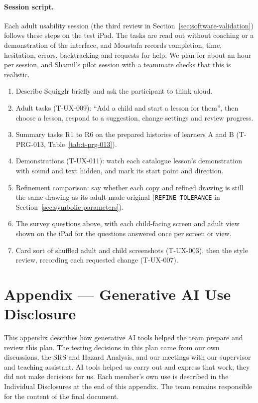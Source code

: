\documentclass[12pt, titlepage]{article}
\begin{document}
\paragraph{Session script.} Each adult usability session (the third review in
Section~\ref{sec:software-validation}) follows these steps on the test iPad. The
tasks are read out without coaching or a demonstration of the interface, and
Moustafa records completion, time, hesitation, errors, backtracking and requests
for help. We plan for about an hour per session, and Shamil's pilot session with a
teammate checks that this is realistic.
\begin{enumerate}
  \item Describe Squigglr briefly and ask the participant to think aloud.
  \item Adult tasks (T-UX-009): ``Add a child and start a lesson for them'', then
    choose a lesson, respond to a suggestion, change settings and review progress.
  \item Summary tasks R1 to R6 on the prepared histories of learners A and B
    (T-PRG-013, Table~\ref{tab:t-prg-013}).
  \item Demonstrations (T-UX-011): watch each catalogue lesson's demonstration
    with sound and text hidden, and mark its start point and direction.
  \item Refinement comparison: say whether each copy and refined drawing is still
    the same drawing as its adult-made original (\texttt{REFINE\_TOLERANCE} in
    Section~\ref{sec:symbolic-parameters}).
  \item The survey questions above, with each child-facing screen and adult view
    shown on the iPad for the questions answered once per screen or view.
  \item Card sort of shuffled adult and child screenshots (T-UX-003), then the
    style review, recording each requested change (T-UX-007).
\end{enumerate}

\newpage{}

\section{Appendix --- Generative AI Use Disclosure}

This appendix describes how generative AI tools helped the team prepare and
review this plan. The testing decisions in this plan came from our own
discussions, the SRS and Hazard Analysis, and our meetings with our supervisor
and teaching assistant. AI tools helped us carry out and express that work;
they did not make decisions for us. Each member's own use is described in the
Individual Disclosures at the end of this appendix. The team remains
responsible for the content of the final document.
\end{document}
